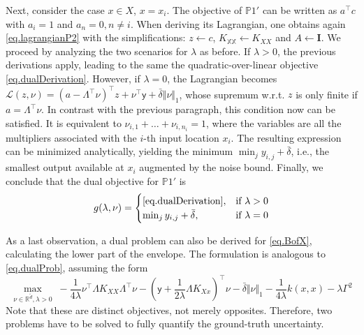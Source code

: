 \begin{my_proof}
	Next, consider the case $x \in X$, $x = x_i$. The objective of $\mathds{P}1'$ can be written as $a^\top c$ with $a_i = 1$ and $a_n=0, n \neq i$. When deriving its Lagrangian, one obtains again \eqref{eq.lagrangianP2} with the simplifications: $z \leftarrow c$, $K_{\mathds{X}\mathds{X}} \leftarrow K_{XX}$ and $A \leftarrow \textbf{I}$. We proceed by analyzing the two scenarios for $\lambda$ as before. If $\lambda > 0$, the previous derivations apply, leading to the same the quadratic-over-linear objective \eqref{eq.dualDerivation}. However, if $\lambda = 0$, the Lagrangian becomes $\mathcal{L}(z,\nu) = (a -  \Lambda^\top \nu)^\top z + \nu^\top \mathsf{y} + \bar\delta \Vert \nu \Vert_1$, whose supremum w.r.t. $z$ is only finite if $a = \Lambda^\top \nu$. In contrast with the previous paragraph, this condition now can be satisfied. It is equivalent to $\nu_{i,1} + \dots + \nu_{i,n_i} = 1$, where the variables are all the multipliers associated with the $i$-th input location $x_i$. The resulting expression can be minimized analytically, yielding the minimum $\min_{j} y_{i,j} + \bar\delta$, i.e., the smallest output available at $x_i$ augmented by the noise bound. Finally, we conclude that the dual objective for $\mathds{P}1'$ is
	\begin{equation}
		g(\lambda,\nu) = 
		\begin{cases}
			\eqref{eq.dualDerivation}, & \text{if } \lambda > 0 \\
			\min_j y_{i,j} + \bar\delta, & \text{if } \lambda = 0
		\end{cases}
	\end{equation}
	
	As a last observation, a dual problem can also be derived for \eqref{eq.BofX}, calculating the lower part of the envelope. The formulation is analogous to \eqref{eq.dualProb}, assuming the form
		\begin{equation}
			\max_{\nu \in \mathbb{R}^{\tilde d}, \lambda > 0}\; -\frac{1}{4\lambda} \nu^\top \Lambda K_{XX} \Lambda^\top \nu - \left(\mathsf{y} + \frac{1}{2\lambda} \Lambda K_{Xx} \right)^\top \nu - \bar \delta \Vert \nu \Vert_1 - \frac{1}{4\lambda} k(x,x) - \lambda \Gamma^2
		\end{equation}
	Note that these are distinct objectives, not merely opposites. Therefore, two problems have to be solved to fully quantify the ground-truth uncertainty.
\end{my_proof} 

